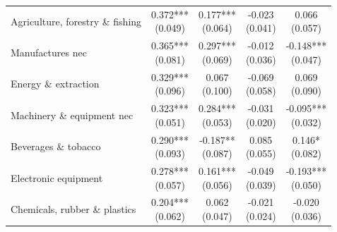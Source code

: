\begin{table}[t]
\begin{tabular*}{\linewidth}{@{\extracolsep{\fill}}l|cccc}
Agriculture, forestry \& fishing & \shortstack[l]{0.372*** \\(0.049)} & \shortstack[l]{0.177*** \\(0.064)} & \shortstack[l]{-0.023 \\(0.041)} & \shortstack[l]{0.066 \\(0.057)} \\ 
Manufactures nec & \shortstack[l]{0.365*** \\(0.081)} & \shortstack[l]{0.297*** \\(0.069)} & \shortstack[l]{-0.012 \\(0.036)} & \shortstack[l]{-0.148*** \\(0.047)} \\ 
Energy \& extraction & \shortstack[l]{0.329*** \\(0.096)} & \shortstack[l]{0.067 \\(0.100)} & \shortstack[l]{-0.069 \\(0.058)} & \shortstack[l]{0.069 \\(0.090)} \\ 
Machinery \& equipment nec & \shortstack[l]{0.323*** \\(0.051)} & \shortstack[l]{0.284*** \\(0.053)} & \shortstack[l]{-0.031 \\(0.020)} & \shortstack[l]{-0.095*** \\(0.032)} \\ 
Beverages \& tobacco & \shortstack[l]{0.290*** \\(0.093)} & \shortstack[l]{-0.187** \\(0.087)} & \shortstack[l]{0.085 \\(0.055)} & \shortstack[l]{0.146* \\(0.082)} \\ 
Electronic equipment & \shortstack[l]{0.278*** \\(0.057)} & \shortstack[l]{0.161*** \\(0.056)} & \shortstack[l]{-0.049 \\(0.039)} & \shortstack[l]{-0.193*** \\(0.050)} \\ 
Chemicals, rubber \& plastics & \shortstack[l]{0.204*** \\(0.062)} & \shortstack[l]{0.062 \\(0.047)} & \shortstack[l]{-0.021 \\(0.024)} & \shortstack[l]{-0.020 \\(0.036)} \\ 

\end{tabular*}
\end{table}
